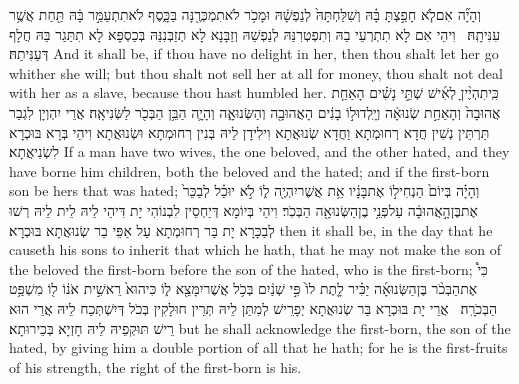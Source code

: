 {וְהָיָ֞ה אִם\maqqaf לֹ֧א חָפַ֣צְתָּ בָּ֗הּ וְשִׁלַּחְתָּהּ֙ לְנַפְשָׁ֔הּ וּמָכֹ֥ר לֹא\maqqaf תִמְכְּרֶ֖נָּה בַּכָּ֑סֶף לֹא\maqqaf תִתְעַמֵּ֣ר בָּ֔הּ תַּ֖חַת אֲשֶׁ֥ר עִנִּיתָֽהּ׃ \setuma }
{וִיהֵי אִם לָא תִתְרְעֵי בַהּ וְתִפְטְרִנַּהּ לְנַפְשַׁהּ וְזַבָּנָא לָא תְזַבְּנִנַּהּ בְּכַסְפָּא לָא תִתַּגַר בַּהּ חֲלָף דְּעַנִּיתַהּ׃}
{And it shall be, if thou have no delight in her, then thou shalt let her go whither she will; but thou shalt not sell her at all for money, thou shalt not deal with her as a slave, because thou hast humbled her.}{}
{כִּֽי\maqqaf תִהְיֶ֨יןָ לְאִ֜ישׁ שְׁתֵּ֣י נָשִׁ֗ים הָאַחַ֤ת אֲהוּבָה֙ וְהָאַחַ֣ת שְׂנוּאָ֔ה וְיָֽלְדוּ\maqqaf ל֣וֹ בָנִ֔ים הָאֲהוּבָ֖ה וְהַשְּׂנוּאָ֑ה וְהָיָ֛ה הַבֵּ֥ן הַבְּכֹ֖ר לַשְּׂנִיאָֽה׃}
{אֲרֵי יִהְוְיָן לִגְבַר תַּרְתֵּין נְשִׁין חֲדָא רְחוּמְתָא וַחֲדָא שְׂנוּאֲתָא וִילִידָן לֵיהּ בְּנִין רְחוּמְתָא וּשְׂנוּאֲתָא וִיהֵי בְּרָא בּוּכְרָא לִשְׂנִיאֲתָא׃}
{If a man have two wives, the one beloved, and the other hated, and they have borne him children, both the beloved and the hated; and if the first-born son be hers that was hated;}{}
{וְהָיָ֗ה בְּיוֹם֙ הַנְחִיל֣וֹ אֶת\maqqaf בָּנָ֔יו אֵ֥ת אֲשֶׁר\maqqaf יִהְיֶ֖ה ל֑וֹ לֹ֣א יוּכַ֗ל לְבַכֵּר֙ אֶת\maqqaf בֶּן\maqqaf הָ֣אֲהוּבָ֔ה עַל\maqqaf פְּנֵ֥י בֶן\maqqaf הַשְּׂנוּאָ֖ה הַבְּכֹֽר׃}
{וִיהֵי בְּיוֹמָא דְּיַחְסֵין לִבְנוֹהִי יָת דִּיהֵי לֵיהּ לֵית לֵיהּ רְשׁוּ לְבַכָּרָא יָת בַּר רְחוּמְתָא עַל אַפֵּי בַר שְׂנוּאֲתָא בּוּכְרָא׃}
{then it shall be, in the day that he causeth his sons to inherit that which he hath, that he may not make the son of the beloved the first-born before the son of the hated, who is the first-born;}{}
{כִּי֩ אֶת\maqqaf הַבְּכֹ֨ר בֶּן\maqqaf הַשְּׂנוּאָ֜ה יַכִּ֗יר לָ֤תֶת לוֹ֙ פִּ֣י שְׁנַ֔יִם בְּכֹ֥ל אֲשֶׁר\maqqaf יִמָּצֵ֖א ל֑וֹ כִּי\maqqaf הוּא֙ רֵאשִׁ֣ית אֹנ֔וֹ ל֖וֹ מִשְׁפַּ֥ט הַבְּכֹרָֽה׃ \setuma }
{אֲרֵי יָת בּוּכְרָא בַּר שְׂנוּאֲתָא יְפָרֵישׁ לְמִתַּן לֵיהּ תְּרֵין חוּלָקִין בְּכֹל דְּיִשְׁתְּכַח לֵיהּ אֲרֵי הוּא רֵישׁ תּוּקְפֵיהּ לֵיהּ חָזְיָא בְּכֵירוּתָא׃}
{but he shall acknowledge the first-born, the son of the hated, by giving him a double portion of all that he hath; for he is the first-fruits of his strength, the right of the first-born is his.}{}
